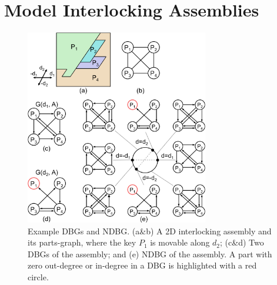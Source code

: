 
\section{Model Interlocking Assemblies}
\label{sec:model}
%


\begin{figure}[!t]
	\centering
	\includegraphics[width=8.00cm]{images/NDBG.png}
	\vspace*{-2.5mm}
	\caption{Example DBGs and NDBG.
		(a\&b) A 2D interlocking assembly and its parts-graph, where the key $P_1$ is movable along $d_2$;
		(c\&d) Two DBGs of the assembly; and
		(e) NDBG of the assembly.
		A part with zero out-degree or in-degree in a DBG is highlighted with a red circle. 
	}
	\vspace*{-4.0mm}
	\label{fig:NDBG}
\end{figure}

